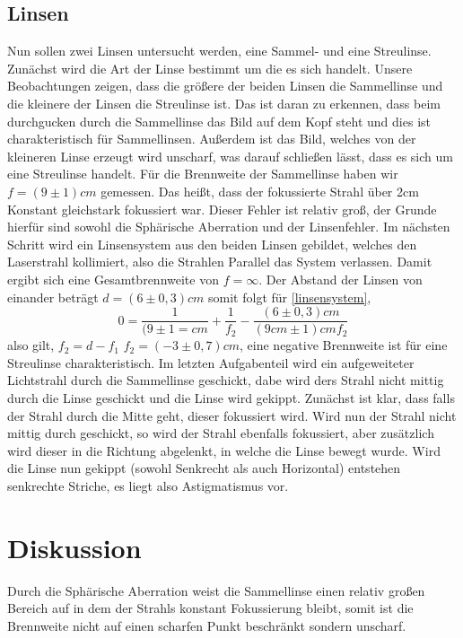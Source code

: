 \subsection{Linsen}
Nun sollen zwei Linsen untersucht werden, eine Sammel- und eine Streulinse. Zunächst wird die Art der Linse bestimmt um die es sich handelt. Unsere Beobachtungen zeigen, dass die größere der beiden Linsen die Sammellinse und die kleinere der Linsen die Streulinse ist.
Das ist daran zu erkennen, dass beim durchgucken durch die Sammellinse das Bild auf dem Kopf steht und dies ist charakteristisch für Sammellinsen.
Außerdem ist das Bild, welches von der kleineren Linse erzeugt wird unscharf, was darauf schließen lässt, dass es sich um eine Streulinse handelt.
Für die Brennweite der Sammellinse haben wir $ f=(9\pm1)\si{cm} $ gemessen. Das heißt, dass der fokussierte Strahl über 2cm Konstant gleichstark fokussiert war. Dieser Fehler ist relativ groß, der Grunde hierfür sind sowohl die Sphärische Aberration und der Linsenfehler.
Im nächsten Schritt wird ein Linsensystem aus den beiden Linsen gebildet, welches den Laserstrahl kollimiert, also die Strahlen Parallel das System verlassen.
Damit ergibt sich eine Gesamtbrennweite von $ f=\infty $.
Der Abstand der Linsen von einander beträgt $ d=(6\pm0,3) \si{cm} $ somit folgt für \eqref{linsensystem},
\begin{equation}
0=\frac{1}{(9\pm1=\si{cm}}+\frac{1}{f_{2}}-\frac{(6\pm0,3)\si{cm}}{(9cm\pm1)\si{cm} f_{2}}
\end{equation}
also gilt, $ f_{2}=d-f_{1} $ \Rightarrow $ f_{2}=(-3\pm0,7) \si{cm} $, eine negative Brennweite ist für eine Streulinse charakteristisch.
Im letzten Aufgabenteil wird ein aufgeweiteter Lichtstrahl durch die Sammellinse geschickt, dabe wird ders Strahl nicht mittig durch die Linse geschickt und die Linse wird gekippt.
Zunächst ist klar, dass falls der Strahl durch die Mitte geht, dieser fokussiert wird. Wird nun der Strahl nicht mittig durch geschickt, so wird der Strahl ebenfalls fokussiert, aber zusätzlich wird dieser in die Richtung abgelenkt, in welche die Linse bewegt wurde.
Wird die Linse nun gekippt (sowohl Senkrecht als auch Horizontal) entstehen senkrechte Striche, es liegt also Astigmatismus vor.




\newpage
\section{Diskussion} 
Durch die Sphärische Aberration weist die Sammellinse einen relativ großen Bereich auf in dem der  Strahls konstant Fokussierung bleibt, somit ist die Brennweite nicht auf einen scharfen Punkt beschränkt sondern unscharf. 

